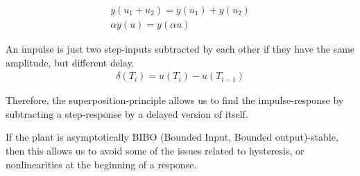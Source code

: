 \begin{align}
    y(u_1 + u_2) = y(u_1) + y(u_2) \\
    \alpha y(u) = y(\alpha u)
\end{align}

An impulse is just two step-inputs subtracted by each other if they have the same amplitude, but different delay.
\begin{align}
    \delta(T_i) = u(T_i) - u(T_{i-1})
\end{align}

Therefore, the superposition-principle allows us to find the impulse-response by subtracting a step-response by a delayed version of itself. 

If the plant is asymptotically BIBO (Bounded Input, Bounded output)-stable, then this allows us to avoid some of the issues related to hysteresis, or nonlinearities at the beginning of a response. 





